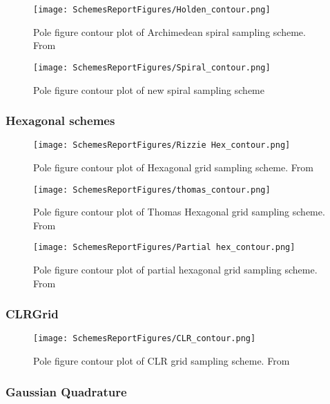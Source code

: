 \documentclass{article}
\begin{document}
\begin{figure}[ht]
    \centering
    \texttt{[image: SchemesReportFigures/Holden\_contour.png]}
    \caption{Pole figure contour plot of Archimedean spiral sampling scheme. From \cite{Holden}}
\end{figure}

\begin{figure}[ht]
    \centering
    \texttt{[image: SchemesReportFigures/Spiral\_contour.png]}
    \caption{Pole figure contour plot of new spiral sampling scheme}
\end{figure}


\subsubsection{Hexagonal schemes}
\begin{figure}[ht]
    \centering
    \texttt{[image: SchemesReportFigures/Rizzie Hex\_contour.png]}
    \caption{Pole figure contour plot of Hexagonal grid sampling scheme. From \cite{Rizzie}}
\end{figure}


\begin{figure}[ht]
    \centering
    \texttt{[image: SchemesReportFigures/thomas\_contour.png]}
    \caption{Pole figure contour plot of Thomas Hexagonal grid sampling scheme. From \cite{Matthies}}
\end{figure}


\begin{figure}[ht]
    \centering
    \texttt{[image: SchemesReportFigures/Partial hex\_contour.png]}
    \caption{Pole figure contour plot of partial hexagonal grid sampling scheme. From \cite{Rizzie}}
\end{figure}


\subsubsection{CLRGrid}

\begin{figure}[ht]
    \centering
    \texttt{[image: SchemesReportFigures/CLR\_contour.png]}
    \caption{Pole figure contour plot of CLR grid sampling scheme. From \cite{Bruker}}
\end{figure}


\subsubsection{Gaussian Quadrature}
\end{document}
